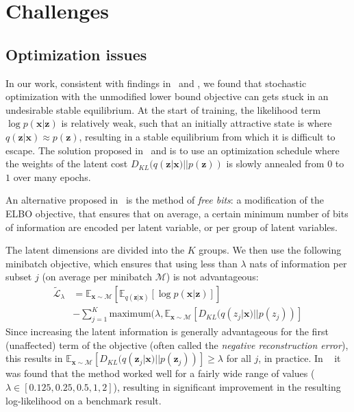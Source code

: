 \documentclass[MAL,biber]{nowfnt} %
\newcommand{\bb}[1]{\mathbf{#1}}
\newcommand{\bx}{\bb{x}}
\newcommand{\bz}{\bb{z}}
\newcommand{\Exp}[2]{\mathbb{E}_{#1}\left[#2\right]}
\begin{document}
\section{Challenges}

\subsection{Optimization issues}

In our work, consistent with findings in~\citep{bowman2015generating} and \citep{sonderby2016train}, we found that stochastic optimization with the unmodified lower bound objective can gets stuck in an undesirable stable equilibrium. At the start of training, the likelihood term $\log p(\bx|\bz)$ is relatively weak, such that an initially attractive state is where $q(\bz|\bx) \approx p(\bz)$, resulting in a stable equilibrium from which it is difficult to escape. The solution proposed in~\citep{bowman2015generating} and \citep{sonderby2016train} is to use an optimization schedule where the weights of the latent cost $D_{KL}(q(\bz|\bx)||p(\bz))$ is slowly annealed from $0$ to $1$ over many epochs. 

An alternative proposed in~\citep{kingma2016improving} is the method of \emph{free bits}: a modification of the ELBO objective, that ensures that on average, a certain minimum number of bits of information are encoded per latent variable, or per group of latent variables.

The latent dimensions are divided into the $K$ groups. We then use the following minibatch objective, which ensures that using less than $\lambda$ nats of information per subset $j$ (on average per minibatch $\mathcal{M}$) is not advantageous:
\begin{align}
\widetilde{\mathcal{L}}_\lambda &= \Exp{\bx \sim \mathcal{M}}{\Exp{q(\bz|\bx)}{ \log p(\bx|\bz) }} \\
&- \sum_{j=1}^K \text{maximum}(\lambda, \Exp{\bx \sim \mathcal{M}}{ D_{KL}(q(z_j|\bx)||p(z_j)) }
\label{eq:freebits}
\end{align}
Since increasing the latent information is generally advantageous for the first (unaffected) term of the objective (often called the \emph{negative reconstruction error}), this results in $\Exp{\bx \sim \mathcal{M}}{D_{KL}(q(\bz_j|\bx)||p(\bz_j))} \geq \lambda$ for all $j$, in practice. In ~\cite{kingma2016improving} it was found that the method worked well for a fairly wide range of values ($\lambda \in [0.125,0.25,0.5,1,2]$), resulting in significant improvement in the resulting log-likelihood on a benchmark result.
\end{document}
